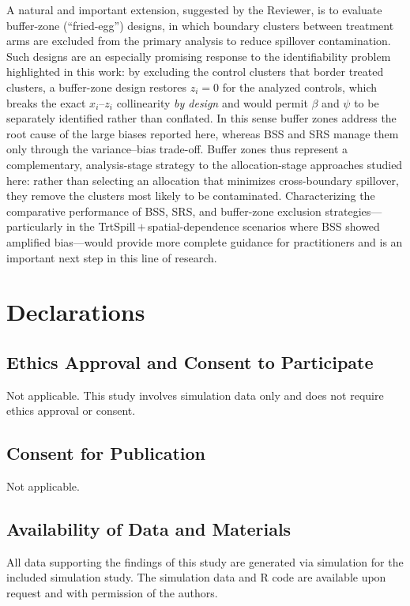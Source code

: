 \documentclass{article}[11pt]
\begin{document}
A natural and important extension, suggested by the Reviewer, is to evaluate buffer-zone (``fried-egg'') designs, in which boundary clusters between treatment arms are excluded from the primary analysis to reduce spillover contamination\cite{jarvis_spatial_2017}. Such designs are an especially promising response to the identifiability problem highlighted in this work: by excluding the control clusters that border treated clusters, a buffer-zone design restores $z_i = 0$ for the analyzed controls, which breaks the exact $x_i$--$z_i$ collinearity \emph{by design} and would permit $\beta$ and $\psi$ to be separately identified rather than conflated. In this sense buffer zones address the root cause of the large biases reported here, whereas BSS and SRS manage them only through the variance--bias trade-off. Buffer zones thus represent a complementary, analysis-stage strategy to the allocation-stage approaches studied here: rather than selecting an allocation that minimizes cross-boundary spillover, they remove the clusters most likely to be contaminated. Characterizing the comparative performance of BSS, SRS, and buffer-zone exclusion strategies---particularly in the TrtSpill\,$+$\,spatial-dependence scenarios where BSS showed amplified bias---would provide more complete guidance for practitioners and is an important next step in this line of research.

\section*{Declarations}

\subsection*{Ethics Approval and Consent to Participate}
Not applicable. This study involves simulation data only and does not require ethics approval or consent.

\subsection*{Consent for Publication}
Not applicable.

\subsection*{Availability of Data and Materials}
All data supporting the findings of this study are generated via simulation for the included simulation study. The simulation data and R code are available upon request and with permission of the authors.
\end{document}
